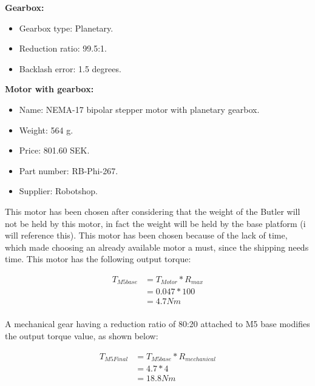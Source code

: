 \begin{enumerate}
    \textbf{Gearbox:}
    \begin{itemize}
        \item Gearbox type: Planetary.
        \item Reduction ratio: 99.5:1.
        \item Backlash error: 1.5 degrees.\\
    \end{itemize}
    
    \textbf{Motor with gearbox:}
    \begin{itemize}
        \item Name: NEMA-17 bipolar stepper motor with planetary gearbox.
        \item Weight: 564 g.
        \item Price: 801.60 SEK.
        \item Part number: RB-Phi-267.
        \item Supplier: Robotshop.\\
    \end{itemize}
    
    This motor has been chosen after considering that the weight of the Butler will not be held by this motor, in fact the weight will be held by the base platform (i will reference this). 
    This motor has been chosen because of the lack of time, which made choosing an already available motor a must, since the shipping needs time. This motor has the following output torque:
    
    \begin{equation} \label{eq: T_M5base}
    \begin{split}
    T_{M5base} & = T_{Motor} * R_{max}\\
    & =  0.047 * 100\\
    & = 4.7 Nm\\
    \end{split}
    \end{equation}
    
    A mechanical gear having a reduction ratio of 80:20 attached to M5 base modifies the output torque value, as shown below:
    
    \begin{equation} \label{eq: T_M5Final}
    \begin{split}
    T_{M5Final} & = T_{M5base} * R_{mechanical}\\
    & = 4.7 * 4\\
    & = 18.8 Nm\\
    \end{split}
    \end{equation}
\end{enumerate}


